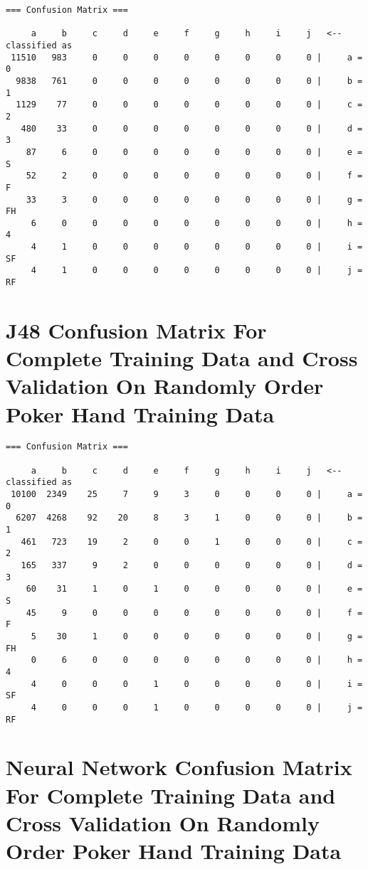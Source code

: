 \documentclass[10pt, a4paper]{article}
\begin{document}
\begin{verbatim}
=== Confusion Matrix ===

     a     b     c     d     e     f     g     h     i     j   <-- classified as
 11510   983     0     0     0     0     0     0     0     0 |     a = 0
  9838   761     0     0     0     0     0     0     0     0 |     b = 1
  1129    77     0     0     0     0     0     0     0     0 |     c = 2
   480    33     0     0     0     0     0     0     0     0 |     d = 3
    87     6     0     0     0     0     0     0     0     0 |     e = S
    52     2     0     0     0     0     0     0     0     0 |     f = F
    33     3     0     0     0     0     0     0     0     0 |     g = FH
     6     0     0     0     0     0     0     0     0     0 |     h = 4
     4     1     0     0     0     0     0     0     0     0 |     i = SF
     4     1     0     0     0     0     0     0     0     0 |     j = RF
\end{verbatim}

\section{J48 Confusion Matrix For Complete Training Data and Cross Validation On Randomly Order Poker Hand Training Data}

\begin{verbatim}
=== Confusion Matrix ===

     a     b     c     d     e     f     g     h     i     j   <-- classified as
 10100  2349    25     7     9     3     0     0     0     0 |     a = 0
  6207  4268    92    20     8     3     1     0     0     0 |     b = 1
   461   723    19     2     0     0     1     0     0     0 |     c = 2
   165   337     9     2     0     0     0     0     0     0 |     d = 3
    60    31     1     0     1     0     0     0     0     0 |     e = S
    45     9     0     0     0     0     0     0     0     0 |     f = F
     5    30     1     0     0     0     0     0     0     0 |     g = FH
     0     6     0     0     0     0     0     0     0     0 |     h = 4
     4     0     0     0     1     0     0     0     0     0 |     i = SF
     4     0     0     0     1     0     0     0     0     0 |     j = RF
\end{verbatim}

\section{Neural Network Confusion Matrix For Complete Training Data and Cross Validation On Randomly Order Poker Hand Training Data}
\end{document}
